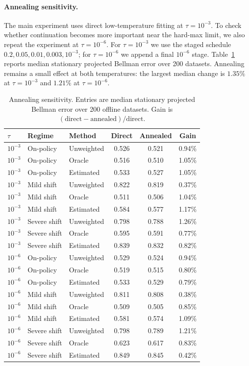 \paragraph{Annealing sensitivity.}
The main experiment uses direct low-temperature fitting at $\tau=10^{-3}$. To
check whether continuation becomes more important near the hard-max limit, we
also repeat the experiment at $\tau=10^{-6}$. For $\tau=10^{-3}$ we use the
staged schedule $0.2,0.05,0.01,0.003,10^{-3}$; for $\tau=10^{-6}$ we append a
final $10^{-6}$ stage. Table~\ref{tab:soft-fqi-annealing-sensitivity} reports
median stationary projected Bellman error over 200 datasets. Annealing remains
a small effect at both temperatures: the largest median change is $1.35\%$ at
$\tau=10^{-3}$ and $1.21\%$ at $\tau=10^{-6}$.

\begin{table}[t]
\centering
\caption{Annealing sensitivity. Entries are median stationary projected
Bellman error over 200 offline datasets. Gain is
$(\mathrm{direct}-\mathrm{annealed})/\mathrm{direct}$.}
\label{tab:soft-fqi-annealing-sensitivity}
\begin{tabular}{lllccc}
\toprule
\(\tau\) & Regime & Method & Direct & Annealed & Gain \\
\midrule
\(10^{-3}\) & On-policy & Unweighted & 0.526 & 0.521 & 0.94\% \\
\(10^{-3}\) & On-policy & Oracle & 0.516 & 0.510 & 1.05\% \\
\(10^{-3}\) & On-policy & Estimated & 0.533 & 0.527 & 1.05\% \\
\(10^{-3}\) & Mild shift & Unweighted & 0.822 & 0.819 & 0.37\% \\
\(10^{-3}\) & Mild shift & Oracle & 0.511 & 0.506 & 1.04\% \\
\(10^{-3}\) & Mild shift & Estimated & 0.584 & 0.577 & 1.17\% \\
\(10^{-3}\) & Severe shift & Unweighted & 0.798 & 0.788 & 1.26\% \\
\(10^{-3}\) & Severe shift & Oracle & 0.595 & 0.591 & 0.77\% \\
\(10^{-3}\) & Severe shift & Estimated & 0.839 & 0.832 & 0.82\% \\
\(10^{-6}\) & On-policy & Unweighted & 0.529 & 0.524 & 0.94\% \\
\(10^{-6}\) & On-policy & Oracle & 0.519 & 0.515 & 0.80\% \\
\(10^{-6}\) & On-policy & Estimated & 0.533 & 0.529 & 0.79\% \\
\(10^{-6}\) & Mild shift & Unweighted & 0.811 & 0.808 & 0.38\% \\
\(10^{-6}\) & Mild shift & Oracle & 0.509 & 0.505 & 0.85\% \\
\(10^{-6}\) & Mild shift & Estimated & 0.581 & 0.574 & 1.09\% \\
\(10^{-6}\) & Severe shift & Unweighted & 0.798 & 0.789 & 1.21\% \\
\(10^{-6}\) & Severe shift & Oracle & 0.623 & 0.617 & 0.83\% \\
\(10^{-6}\) & Severe shift & Estimated & 0.849 & 0.845 & 0.42\% \\
\bottomrule
\end{tabular}
\end{table}
